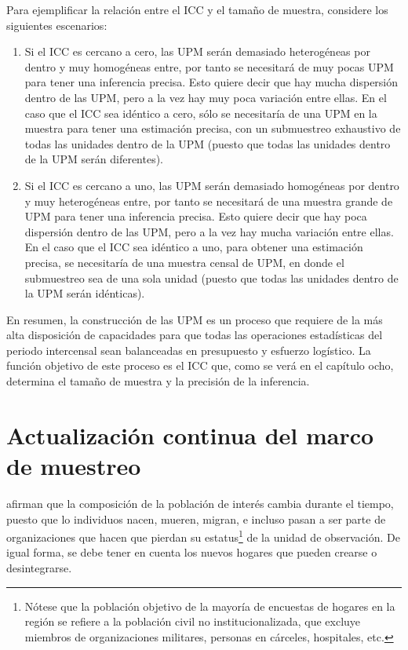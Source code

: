 \documentclass[
  12pt,
]{book}
\begin{document}
Para ejemplificar la relación entre el ICC y el tamaño de muestra, considere los siguientes escenarios:

\begin{enumerate}
\def\labelenumi{\arabic{enumi}.}
\item
  Si el ICC es cercano a cero, las UPM serán demasiado heterogéneas por dentro y muy homogéneas entre, por tanto se necesitará de muy pocas UPM para tener una inferencia precisa. Esto quiere decir que hay mucha dispersión dentro de las UPM, pero a la vez hay muy poca variación entre ellas. En el caso que el ICC sea idéntico a cero, sólo se necesitaría de una UPM en la muestra para tener una estimación precisa, con un submuestreo exhaustivo de todas las unidades dentro de la UPM (puesto que todas las unidades dentro de la UPM serán diferentes).
\item
  Si el ICC es cercano a uno, las UPM serán demasiado homogéneas por dentro y muy heterogéneas entre, por tanto se necesitará de una muestra grande de UPM para tener una inferencia precisa. Esto quiere decir que hay poca dispersión dentro de las UPM, pero a la vez hay mucha variación entre ellas. En el caso que el ICC sea idéntico a uno, para obtener una estimación precisa, se necesitaría de una muestra censal de UPM, en donde el submuestreo sea de una sola unidad (puesto que todas las unidades dentro de la UPM serán idénticas).
\end{enumerate}

En resumen, la construcción de las UPM es un proceso que requiere de la más alta disposición de capacidades para que todas las operaciones estadísticas del periodo intercensal sean balanceadas en presupuesto y esfuerzo logístico. La función objetivo de este proceso es el ICC que, como se verá en el capítulo ocho, determina el tamaño de muestra y la precisión de la inferencia.

\hypertarget{actualizaciuxf3n-continua-del-marco-de-muestreo}{%
\section{Actualización continua del marco de muestreo}\label{actualizaciuxf3n-continua-del-marco-de-muestreo}}

\citet[pág. 105]{Duncan_Kalton_1987} afirman que la composición de la población de interés cambia durante el tiempo, puesto que lo individuos nacen, mueren, migran, e incluso pasan a ser parte de organizaciones que hacen que pierdan su estatus\footnote{Nótese que la población objetivo de la mayoría de encuestas de hogares en la región se refiere a la población civil no institucionalizada, que excluye miembros de organizaciones militares, personas en cárceles, hospitales, etc.} de la unidad de observación. De igual forma, se debe tener en cuenta los nuevos hogares que pueden crearse o desintegrarse.
\end{document}

